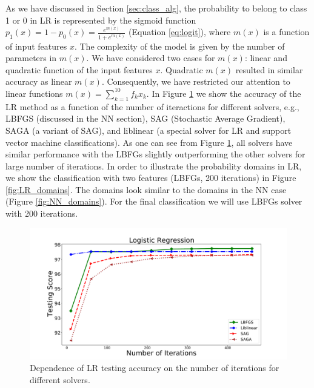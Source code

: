 As we have discussed in Section \ref{sec:class_alg}, 
the probability to belong to class 1 or 0 in LR is represented by the sigmoid function
$p_1(x) = 1 - p_0(x) = \frac{e^{m(x)}}{1 + e^{m(x)}}$ (Equation \ref{eq:logit}),
where $m(x)$ is a function of input features $x$.
The complexity of the model is given by the number of parameters in $m(x)$.
We have considered two cases for $m(x)$: linear and quadratic function of the input features $x$.
Quadratic $m(x)$ resulted in similar accuracy as linear $m(x)$.
Consequently, we have restricted our attention to linear functions $m(x) = \sum_{k = 1}^{10} f_k x_k$.
In Figure \ref{fig:LR_accuracy} we show the accuracy of the LR method as a function of the number of iteractions
for different solvers, e.g., LBFGS (discussed in the NN section), SAG (Stochastic Average Gradient), SAGA (a variant of SAG),
and liblinear (a special solver for LR and support vector machine classifications).
As one can see from Figure \ref{fig:LR_accuracy}, all solvers have similar performance with the LBFGs slightly outperforming the other solvers for large number of iterations.
In order to illustrate the probability domains in LR, we show the classification with two features (LBFGs, 200 iterations)
in Figure \ref{fig:LR_domains}. The domains look similar to the domains in the NN case (Figure \ref{fig:NN_domains}).
For the final classification we will use LBFGs solver with 200 iterations.


\begin{figure}[h]
\includegraphics[width=\twopicsp\textwidth]{plots/lr_train.pdf}
\caption{Dependence of LR testing accuracy on the number of iterations for different solvers.}
\label{fig:LR_accuracy}
\end{figure}



